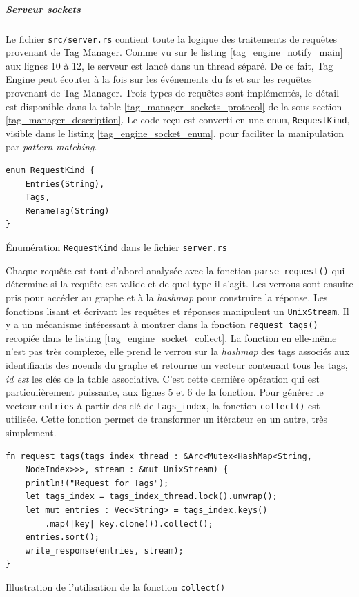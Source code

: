 \subparagraph{Serveur sockets}\label{tag_engine_socket}
Le fichier \texttt{src/server.rs} contient toute la logique des traitements de requêtes 
provenant de Tag Manager. Comme vu sur le listing \ref{tag_engine_notify_main} aux lignes 10 à 12, 
le serveur est lancé dans un thread séparé. De ce fait, Tag Engine peut écouter à la fois sur les 
événements du \acrshort{fs} et sur les requêtes provenant de Tag Manager. Trois types de requêtes 
sont implémentés, le détail est disponible dans la table \ref{tag_manager_sockets_protocol} de la 
sous-section \ref{tag_manager_description}. Le code reçu est converti en une \texttt{enum}, 
\texttt{RequestKind}, visible dans le listing \ref{tag_engine_socket_enum}, pour faciliter 
la manipulation par \textit{pattern matching}.
\bigbreak
\begin{code}
    \begin{verbatim}
enum RequestKind {
    Entries(String),
    Tags,
    RenameTag(String)
}
    \end{verbatim}
    \caption{Énumération \texttt{RequestKind} dans le fichier \texttt{server.rs}}
    \label{tag_engine_socket_enum}
\end{code}
\bigbreak
Chaque requête est tout d'abord analysée avec la 
fonction \texttt{parse_request()} qui détermine si la requête est valide et de quel type 
il s'agit. Les verrous sont ensuite pris pour accéder au graphe et à la \textit{hashmap} pour 
construire la réponse. Les fonctions lisant et écrivant les requêtes et réponses manipulent un 
\texttt{UnixStream}. 
\bigbreak
Il y a un mécanisme intéressant à montrer dans la fonction 
\texttt{request_tags()} recopiée dans le listing \ref{tag_engine_socket_collect}. La 
fonction en elle-même n'est pas très complexe, elle prend le verrou sur la \textit{hashmap} des 
tags associés aux identifiants des noeuds du graphe et retourne un vecteur contenant tous les tags, 
\textit{id est} les clés de la table associative. C'est cette dernière opération qui est 
particulièrement puissante, aux lignes 5 et 6 de la fonction. Pour générer le vecteur 
\texttt{entries} à partir des clé de \texttt{tags_index}, la fonction 
\texttt{collect()} est utilisée. Cette fonction permet de transformer un itérateur en 
un autre, très simplement.
\bigbreak
\begin{code}
    \begin{verbatim}
fn request_tags(tags_index_thread : &Arc<Mutex<HashMap<String, 
    NodeIndex>>>, stream : &mut UnixStream) {
    println!("Request for Tags");
    let tags_index = tags_index_thread.lock().unwrap();
    let mut entries : Vec<String> = tags_index.keys()
        .map(|key| key.clone()).collect();
    entries.sort();
    write_response(entries, stream);
}
    \end{verbatim}
    \caption{Illustration de l'utilisation de la fonction \texttt{collect()}}
    \label{tag_engine_socket_collect}
\end{code}
\bigbreak

